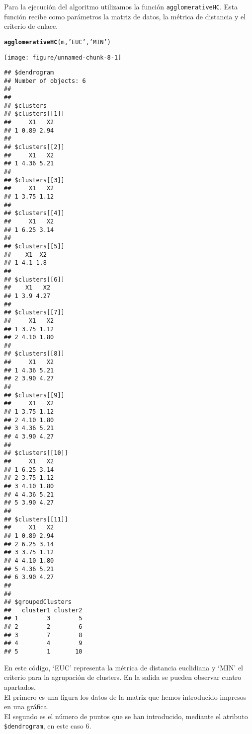 \documentclass[12pt]{report}\usepackage[]{graphicx}\usepackage[dvipsnames]{xcolor}
\makeatletter
\def\maxwidth{ %
  \ifdim\Gin@nat@width>\linewidth
    \linewidth
  \else
    \Gin@nat@width
  \fi
}
\newcommand{\hlstr}[1]{\textcolor[rgb]{0.192,0.494,0.8}{#1}}%
\newcommand{\hlstd}[1]{\textcolor[rgb]{0.345,0.345,0.345}{#1}}%
\newcommand{\hlkwd}[1]{\textcolor[rgb]{0.737,0.353,0.396}{\textbf{#1}}}%
\newenvironment{kframe}{%
 \def\at@end@of@kframe{}%
 \ifinner\ifhmode%
  \def\at@end@of@kframe{\end{minipage}}%
  \begin{minipage}{\columnwidth}%
 \fi\fi%
 \def\FrameCommand##1{\hskip\@totalleftmargin \hskip-\fboxsep
 \colorbox{shadecolor}{##1}\hskip-\fboxsep
     \hskip-\linewidth \hskip-\@totalleftmargin \hskip\columnwidth}%
 \MakeFramed {\advance\hsize-\width
   \@totalleftmargin\z@ \linewidth\hsize
   \@setminipage}}%
 {\par\unskip\endMakeFramed%
 \at@end@of@kframe}
\newenvironment{knitrout}{}{} %
\makeatother
\begin{document}
	Para la ejecución del algoritmo utilizamos la función \texttt{agglomerativeHC}. Esta función recibe como parámetros la matriz de datos, la métrica de distancia y el criterio de enlace.
	
\begin{knitrout}
\color{fgcolor}\begin{kframe}
\begin{alltt}
\hlkwd{agglomerativeHC}\hlstd{(m,} \hlstr{'EUC'}\hlstd{,} \hlstr{'MIN'}\hlstd{)}
\end{alltt}
\end{kframe}
\texttt{[image: figure/unnamed-chunk-8-1]} 
\begin{kframe}\begin{verbatim}
## $dendrogram
## Number of objects: 6 
## 
## 
## $clusters
## $clusters[[1]]
##     X1   X2
## 1 0.89 2.94
## 
## $clusters[[2]]
##     X1   X2
## 1 4.36 5.21
## 
## $clusters[[3]]
##     X1   X2
## 1 3.75 1.12
## 
## $clusters[[4]]
##     X1   X2
## 1 6.25 3.14
## 
## $clusters[[5]]
##    X1  X2
## 1 4.1 1.8
## 
## $clusters[[6]]
##    X1   X2
## 1 3.9 4.27
## 
## $clusters[[7]]
##     X1   X2
## 1 3.75 1.12
## 2 4.10 1.80
## 
## $clusters[[8]]
##     X1   X2
## 1 4.36 5.21
## 2 3.90 4.27
## 
## $clusters[[9]]
##     X1   X2
## 1 3.75 1.12
## 2 4.10 1.80
## 3 4.36 5.21
## 4 3.90 4.27
## 
## $clusters[[10]]
##     X1   X2
## 1 6.25 3.14
## 2 3.75 1.12
## 3 4.10 1.80
## 4 4.36 5.21
## 5 3.90 4.27
## 
## $clusters[[11]]
##     X1   X2
## 1 0.89 2.94
## 2 6.25 3.14
## 3 3.75 1.12
## 4 4.10 1.80
## 5 4.36 5.21
## 6 3.90 4.27
## 
## 
## $groupedClusters
##   cluster1 cluster2
## 1        3        5
## 2        2        6
## 3        7        8
## 4        4        9
## 5        1       10
\end{verbatim}
\end{kframe}
\end{knitrout}
	
	En este código, `EUC' representa la métrica de distancia euclidiana y `MIN' el criterio para la agrupación de clusters. En la salida se pueden observar cuatro apartados.\\
	
	El primero es una figura los datos de la matriz que hemos introducido impresos en una gráfica.\\
	
	El segundo es el número de puntos que se han introducido, mediante el atributo \texttt{\$dendrogram}, en este caso 6.\\
	
\end{document}
